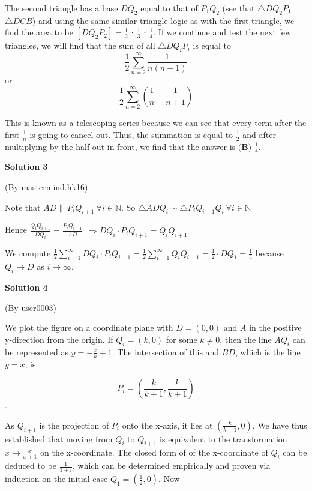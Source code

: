 \begin{enumerate}
 The second triangle has a base $DQ_2^{}$ equal to that of $P_1^{}Q_2^{}$ (see that $\triangle DQ_2^{}P_1^{}$ ~ $\triangle DCB$) and using the same similar triangle logic as with the first triangle, we find the area to be $[DQ_2P_2]=\frac{1}{2}$ ⋅ $\frac{1}{3}$ ⋅ $\frac{1}{4}$. If we continue and test the next few triangles, we will find that the sum of all $\triangle DQ_i^{}P_i^{}$ is equal to 
 \[\frac{1}{2} \sum\limits_{n=2}^\infty \frac{1}{n(n+1)}\] or 
 \[\frac{1}{2} \sum\limits_{n=2}^\infty \left(\frac{1}{n} - \frac{1}{n+1}\right)\]

 This is known as a telescoping series because we can see that every term after the first $\frac{1}{n}$ is going to cancel out. Thus, the summation is equal to $\frac{1}{2}$ and after multiplying by the half out in front, we find that the answer is $\boxed{\textbf{(B) }\frac{1}{4}}$.

 



\textbf{Solution 3}

(By mastermind.hk16)

 Note that $AD \|\ P_iQ_{i+1}\  \forall i \in \mathbb{N}$. So $\triangle ADQ_i \sim \triangle P_{i}Q_{i+1}Q_{i} \ \forall i \in \mathbb{N}$

 Hence $\frac{Q_iQ_{i+1}}{DQ_{i}}=\frac{P_{i}Q_{i+1}}{AD} \ \ \Longrightarrow DQ_i \cdot P_iQ_{i+1}=Q_iQ_{i+1}$

 We compute $\frac{1}{2} \sum_{i=1}^{\infty}DQ_i \cdot P_iQ_{i+1}= \frac{1}{2} \sum_{i=1}^{\infty}Q_iQ_{i+1}=\frac{1}{2} \cdot DQ_1 =\frac{1}{4}$ because $Q_i \rightarrow D$ as $i \rightarrow \infty$.

 



\textbf{Solution 4}

(By user0003)

 We plot the figure on a coordinate plane with $D=(0,0)$ and $A$ in the positive y-direction from the origin. If $Q_i=(k, 0)$ for some $k \neq 0$, then the line $AQ_i$ can be represented as $y=-\frac{x}{k}+1$. The intersection of this and $BD$, which is the line $y=x$, is

 
 \[P_i = \left(\frac{k}{k+1}, \frac{k}{k+1}\right)\].

 As $Q_{i+1}$ is the projection of $P_i$ onto the x-axis, it lies at $\left(\frac{k}{k+1}, 0\right)$. We have thus established that moving from $Q_i$ to $Q_{i+1}$ is equivalent to the transformation $x \rightarrow \frac{x}{x+1}$ on the x-coordinate. The closed form of of the x-coordinate of $Q_i$ can be deduced to be $\frac{1}{1+i}$, which can be determined empirically and proven via induction on the initial case $Q_1 = \left(\frac{1}{2}, 0\right)$. Now


\end{enumerate}
